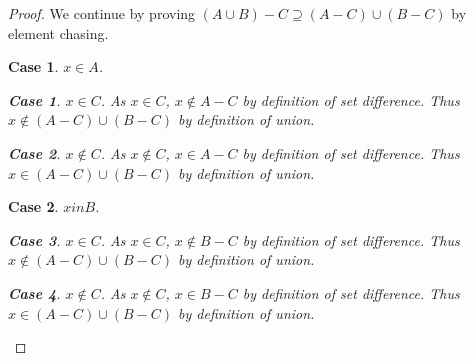 \documentclass[12pt]{article}
\newtheorem{case}{Case}
\newtheorem{subcase}{Case}
\numberwithin{subcase}{case}
\begin{document}
\begin{proof}
We continue by proving $(A\cup B) - C \supseteq (A - C) \cup (B - C)$ by element chasing.
\begin{case}
$x \in A$. 
\begin{subcase}
  $x \in C$. As $x \in C$, $x \not\in A - C$ by definition of set difference. Thus $x \not\in (A - C) \cup (B
  - C)$ by definition of union.
\end{subcase}
\begin{subcase}
  $x \not\in C$. As $x \not\in C$, $x \in A - C$ by definition of set difference. Thus $x \in (A - C) \cup (B
  - C)$ by definition of union.
\end{subcase}
\end{case}
\begin{case}
  $x in B$.
  \begin{subcase}
    $x \in C$. As $x \in C$, $x \not \in B - C$ by definition of set difference. Thus $x \not\in (A - C) \cup (B
    - C)$ by definition of union.
  \end{subcase}
  \begin{subcase}
    $x \not \in C$. As $x \not \in C$, $x \in B - C$ by definition of set difference. Thus $x \in (A - C) \cup
    (B - C)$ by definition of union.
  \end{subcase}
\end{case}
\end{proof}
\end{document}
